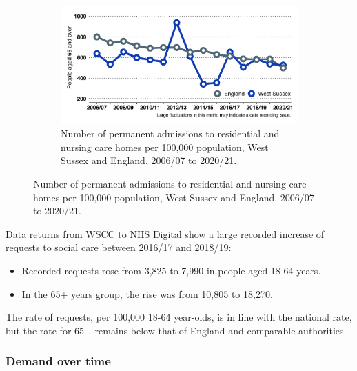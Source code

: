 \begin{figure}
\begin{subfigure}[b]{0.49\textwidth}
        \label{fig:sc:requests_65_plus}
    \end{subfigure}
    \begin{subfigure}[b]{0.55\textwidth}
        \centering
        \includegraphics[width=\textwidth]{images/perm_res_adm_time.png}
        \caption{Number of permanent admissions to residential and nursing care homes per 100,000 population, West Sussex and England, 2006/07 to 2020/21.}
        \label{fig:sc:residential_admissions}
    \end{subfigure}
\end{figure}




Data returns from WSCC to NHS Digital show a large recorded increase of requests to social care between 2016/17 and 2018/19:

\begin{itemize}[noitemsep]
    \item Recorded requests rose from 3,825 to 7,990 in people aged 18-64 years.
    \item In the 65+ years group, the rise was from 10,805 to 18,270.
\end{itemize}

The rate of requests, per 100,000 18-64 year-olds, is in line with the national rate, but the rate for 65+ remains below that of England and comparable authorities.

\subsubsection{Demand over time}
